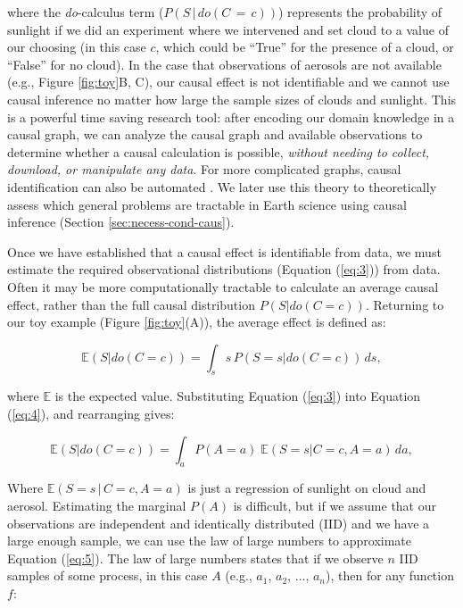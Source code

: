 \documentclass[12pt]{article}
\begin{document}
where the \textit{do}-calculus \citep{pearl2009} term
($P(S \, | \, do(C\, = \,c))$) represents the probability of sunlight
if we did an experiment where we intervened and set cloud to a value
of our choosing (in this case $c$, which could be ``True'' for the
presence of a cloud, or ``False'' for no cloud). In the case that
observations of aerosols are not available (e.g., Figure
\ref{fig:toy}B, C), our causal effect is not identifiable and we
cannot use causal inference no matter how large the sample sizes of
clouds and sunlight. This is a powerful time saving research tool:
after encoding our domain knowledge in a causal graph, we can analyze
the causal graph and available observations to determine whether a
causal calculation is possible, \textit{without needing to collect,
  download, or manipulate any data}. For more complicated graphs,
causal identification can also be automated \citep{shpitser2006}. We
later use this theory to theoretically assess which general problems
are tractable in Earth science using causal inference (Section
\ref{sec:necess-cond-caus}).

Once we have established that a causal effect is identifiable from
data, we must estimate the required observational distributions
(Equation (\ref{eq:3})) from data. Often it may be more computationally
tractable to calculate an average causal effect, rather than the full
causal distribution $P(S | do(C=c))$. Returning to our toy example
(Figure \ref{fig:toy}(A)), the average effect is defined as:

\begin{equation}
  \mathbb{E}(S | do(C = c)) = \int_{s} s \, P(S = s
  | do(C=c)) \, ds,
  \label{eq:4}
\end{equation}

where $\mathbb{E}$ is the expected value. Substituting Equation
(\ref{eq:3}) into Equation (\ref{eq:4}), and rearranging gives:

\begin{equation}
  \mathbb{E}(S | do(C = c))  = \int_{a} P(A=a) \; \mathbb{E}(S=s |
  C=c, A=a) \, d a,
  \label{eq:5}
\end{equation}

Where $\mathbb{E}(S=s \, | \, C=c, A=a)$ is just a regression of sunlight on
cloud and aerosol. Estimating the marginal $P(A)$ is difficult, but
if we assume that our observations are independent and identically
distributed (IID) and we have a large enough sample, we can use the
law of large numbers to approximate Equation (\ref{eq:5}). The law of
large numbers states that if we observe $n$ IID samples of some process, in
this case $A$ (e.g., $a_1$, $a_2$, $\ldots$, $a_n$), then for any
function $f$:
\end{document}
